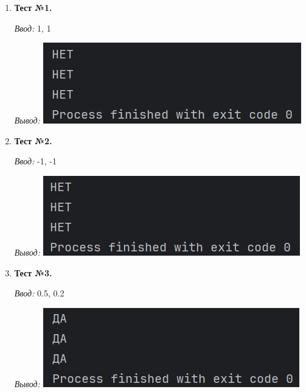 \documentclass[12pt]{article}
\begin{document}
\begin{enumerate}

\item \textbf{Тест №1.} 

\textit{Ввод:} 1, 1

\textit{Вывод:} \includegraphics{img2}



\item \textbf{Тест №2.}

\textit{Ввод:} -1, -1

\textit{Вывод:} \includegraphics{img3}



\item \textbf{Тест №3.}

\textit{Ввод:} 0.5, 0.2

\textit{Вывод:} \includegraphics{img4}



\end{enumerate}
\end{document}
